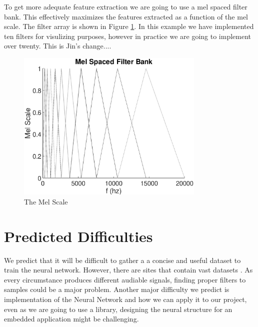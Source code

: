 \documentclass[12pt,journal,compsoc]{IEEEtran}
\begin{document}
To get more adequate feature extraction we are going to use a mel spaced filter bank. This effectively maximizes the features extracted as a function of the mel scale. The filter array is shown in Figure \ref{FA}. In this example we have implemented ten filters for visulizing purposes, however in practice we are going to implement over twenty. This is Jin's change....

\begin{figure}[h]
\includegraphics[width=9cm]{FA.eps}
\caption{The Mel Scale}
\label{FA}
\end{figure}

\section{Predicted Difficulties}
We predict that it will be difficult to gather a a concise and useful dataset to train the neural network. However, there are sites that contain vast datasets \cite{Bird}. As every circumstance produces different audiable signals, finding proper filters to samples could be a major problem. Another major difficulty we predict is implementation of the  Neural Network and how we can apply it to our project, even as we are going to use a library, designing the neural structure for an embedded application might be challenging.
\end{document}
